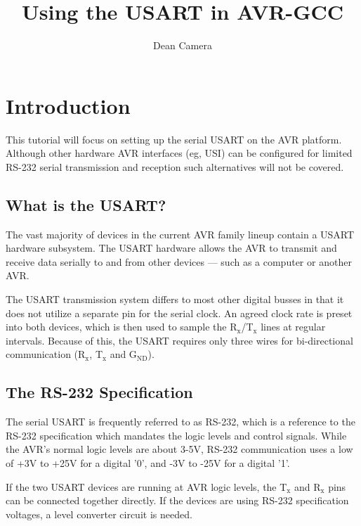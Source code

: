 \documentclass[a4paper,oneside,notitlepage]{book}
\newcommand{\subscript}[1]{\ensuremath{_{\textrm{#1}}}}
\begin{document}
\title{Using the USART in AVR-GCC}
\author{Dean Camera}
\maketitle



\cleardoublepage
\tableofcontents
\cleardoublepage


\chapter{Introduction}

This tutorial will focus on setting up the serial USART on the AVR platform. Although other hardware AVR interfaces (eg, USI) can be configured for limited RS-232 serial transmission and reception such alternatives will not be covered.

\section{What is the USART?}

The vast majority of devices in the current AVR family lineup contain a USART hardware subsystem. The USART hardware allows the AVR to transmit and receive data serially to and from other devices --- such as a computer or another AVR.

The USART transmission system differs to most other digital busses in that it does not utilize a separate pin for the serial clock. An agreed clock rate is preset into both devices, which is then used to sample the R\subscript{x}/T\subscript{x} lines at regular intervals. Because of this, the USART requires only three wires for bi-directional communication (R\subscript{x}, T\subscript{x} and G\subscript{ND}).

\section{The RS-232 Specification}

The serial USART is frequently referred to as RS-232, which is a reference to the RS-232 specification which mandates the logic levels and control signals. While the AVR's normal logic levels are about 3-5V, RS-232 communication uses a low of +3V to +25V for a digital '0', and -3V to -25V for a digital '1'.

If the two USART devices are running at AVR logic levels, the T\subscript{x} and R\subscript{x} pins can be connected together directly. If the devices are using RS-232 specification voltages, a level converter circuit is needed.
\end{document}
